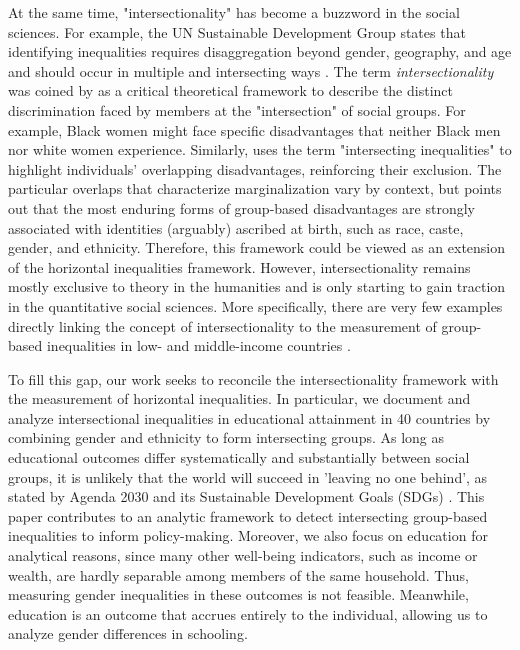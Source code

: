 At the same time, "intersectionality" has become a buzzword in the social sciences. For example, the UN Sustainable Development Group states that identifying inequalities requires disaggregation beyond gender, geography, and age and should occur in multiple and intersecting ways \citep{UNSDG2022}. The term \textit{intersectionality} was coined by \cite{crenshaw1989, Crenshaw1991} as a critical theoretical framework to describe the distinct discrimination faced by members at the "intersection" of social groups. For example, Black women might face specific disadvantages that neither Black men nor white women experience. Similarly, \cite{kabeer2016} uses the term "intersecting inequalities" to highlight individuals' overlapping disadvantages, reinforcing their exclusion. The particular overlaps that characterize marginalization vary by context, but \cite{kabeer2016} points out that the most enduring forms of group-based disadvantages are strongly associated with identities (arguably) ascribed at birth, such as race, caste, gender, and ethnicity. Therefore, this framework could be viewed as an extension of the horizontal inequalities framework. However, intersectionality remains mostly exclusive to theory in the humanities and is only starting to gain traction in the quantitative social sciences. More specifically, there are very few examples directly linking the concept of intersectionality to the measurement of group-based inequalities in low- and middle-income countries \citep[see e.g.,][]{Kabeer2017, Lenhardt2015}.

To fill this gap, our work seeks to reconcile the intersectionality framework with the measurement of horizontal inequalities. In particular, we document and analyze intersectional inequalities in educational attainment in 40 countries by combining gender and ethnicity to form intersecting groups. As long as educational outcomes differ systematically and substantially between social groups, it is unlikely that the world will succeed in 'leaving no one behind', as stated by Agenda 2030 and its Sustainable Development Goals (SDGs) \citep{Stuart2016}. This paper contributes to an analytic framework to detect intersecting group-based inequalities to inform policy-making. Moreover, we also focus on education for analytical reasons, since many other well-being indicators, such as income or wealth, are hardly separable among members of the same household. Thus, measuring gender inequalities in these outcomes is not feasible. Meanwhile, education is an outcome that accrues entirely to the individual, allowing us to analyze gender differences in schooling. 

